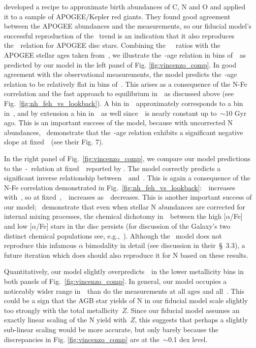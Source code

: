 \documentclass[ms.tex]{subfiles}
\begin{document}
developed a recipe to approximate birth abundances of C, N and O and applied it
to a sample of APOGEE/Kepler red giants.
They found good agreement between the APOGEE abundances and the
\citet{Dopita2016} measurements, so our fiducial model's successful reproduction
of the~\citet{Dopita2016} trend is an indication that it also reproduces
the~\ohno~relation for APOGEE disc stars.
Combining the~\citet{Vincenzo2021}~\no~ratios with the APOGEE stellar ages
taken from~\citet{Miglio2021}, we illustrate the~\no-age relation in bins
of~\feh~as predicted by our model in the left panel of Fig.
\ref{fig:vincenzo_comp}.
In good agreement with the observational measurements, the model predicts
the~\no-age relation to be relatively flat in bins of~\feh.
This arises as a consequence of the N-Fe correlation and the fast approach to
equilibrium in~\oh~as discussed above (see Fig.~\ref{fig:nh_feh_vs_lookback}).
A bin in~\feh~approximately corresponds to a bin in~\nh, and by extension a bin
in~\no~as well since~\oh~is nearly constant up to~$\sim$10 Gyr ago.
This is an important success of the model, because with uncorrected N
abundances,~\citet{Vincenzo2021} demonstrate that the~\no-age relation exhibits
a significant negative slope at fixed~\feh~(see their Fig. 7).
\par
In the right panel of Fig.~\ref{fig:vincenzo_comp}, we compare our model
predictions to the~\no-\ofe~relation at fixed~\oh~reported by
\citet{Vincenzo2021}.
The model correctly predicts a significant inverse relationship
between~\no~and~\ofe.
This is again a consequence of the N-Fe correlation demonstrated in
Fig.~\ref{fig:nh_feh_vs_lookback}:~\nh~increases with~\feh, so at
fixed~\oh,~\no~increases as~\ofe~decreases.
This is another important success of our model;~\citet{Vincenzo2021}
demonstrate that even when stellar N abundances are corrected for internal
mixing processes, the chemical dichotomy in~\no~between the high [$\alpha$/Fe]
and low [$\alpha$/Fe] stars in the disc persists (for discussion of the
Galaxy's two distinct chemical populations see, e.g.,~\citealp{Hayden2015,
Weinberg2019, Weinberg2021, Griffith2021b}).
Although the~\citet{Johnson2021} model does not reproduce this infamous
$\alpha$ bimodality in detail (see discussion in their~\S~3.3), a future
iteration which does should also reproduce it for N based on these results.
\par
Quantitatively, our model slightly overpredicts~\no~in the lower metallicity
bins in both panels of Fig.~\ref{fig:vincenzo_comp}.
In general, our model occupies a noticeably wider range in~\no~than do the
\citet{Vincenzo2021} measurements at all ages and all~\ofe.
This could be a sign that the AGB star yields of N in our fiducial model scale
slightly too strongly with the total metallicity~$Z$.
Since our fiducial model assumes an exactly linear scaling of the N yield
with~$Z$, this suggests that perhaps a slightly sub-linear scaling would be
more accurate, but only barely because the discrepancies in Fig.
\ref{fig:vincenzo_comp} are at the~$\sim$0.1 dex level.
\end{document}
